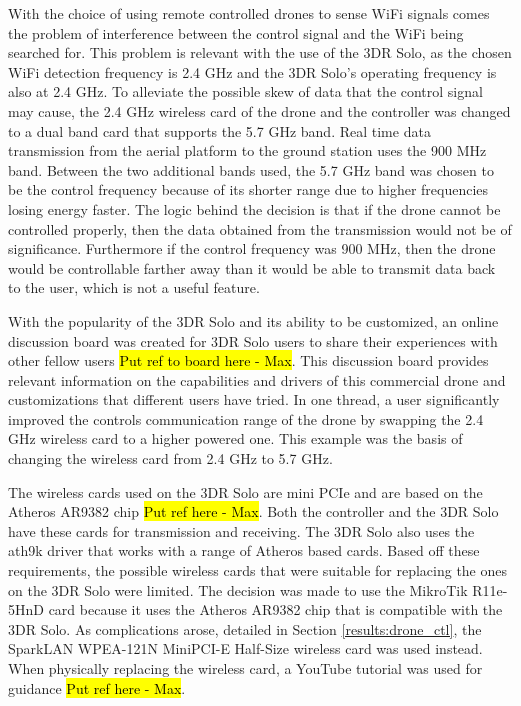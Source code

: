 With the choice of using remote controlled drones to sense WiFi signals comes the problem of interference between the control signal and the WiFi being searched for. This problem is relevant with the use of the 3DR Solo, as the chosen WiFi detection frequency is 2.4 GHz and the 3DR Solo’s operating frequency is also at 2.4 GHz. To alleviate the possible skew of data that the control signal may cause, the 2.4 GHz wireless card of the drone and the controller was changed to a dual band card that supports the 5.7 GHz band. Real time data transmission from the aerial platform to the ground station uses the 900 MHz band. Between the two additional bands used, the 5.7 GHz band was chosen to be the control frequency because of its shorter range due to higher frequencies losing energy faster. The logic behind the decision is that if the drone cannot be controlled properly, then the data obtained from the transmission would not be of significance. Furthermore if the control frequency was 900 MHz, then the drone would be controllable farther away than it would be able to transmit data back to the user, which is not a useful feature.\par 
With the popularity of the 3DR Solo and its ability to be customized, an online discussion board was created for 3DR Solo users to share their experiences with other fellow users \hl{Put ref to board here - Max}. This discussion board provides relevant information on the capabilities and drivers of this commercial drone and customizations that different users have tried. In one thread, a user significantly improved the controls communication range of the drone by swapping the 2.4 GHz wireless card to a higher powered one. This example was the basis of changing the wireless card from 2.4 GHz to 5.7 GHz.\par 
The wireless cards used on the 3DR Solo are mini PCIe and are based on the Atheros AR9382 chip \hl{Put ref here - Max}. Both the controller and the 3DR Solo have these cards for transmission and receiving. The 3DR Solo also uses the ath9k driver that works with a range of Atheros based cards. Based off these requirements, the possible wireless cards that were suitable for replacing the ones on the 3DR Solo were limited. The decision was made to use the MikroTik R11e-5HnD card because it uses the Atheros AR9382 chip that is compatible with the 3DR Solo. As complications arose, detailed in Section \ref{results:drone_ctl}, the SparkLAN WPEA-121N MiniPCI-E Half-Size wireless card was used instead. When physically replacing the wireless card, a YouTube tutorial was used for guidance \hl{Put ref here - Max}. \par 

